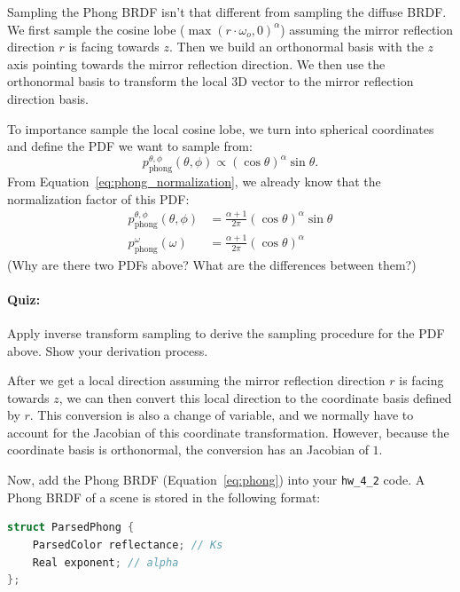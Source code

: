 Sampling the Phong BRDF isn't that different from sampling the diffuse BRDF. We first sample the cosine lobe ($\max\left(r \cdot \omega_o, 0\right)^\alpha$) assuming the mirror reflection direction $r$ is facing towards $z$. Then we build an orthonormal basis with the $z$ axis pointing towards the mirror reflection direction. We then use the orthonormal basis to transform the local 3D vector to the mirror reflection direction basis.

To importance sample the local cosine lobe, we turn into spherical coordinates and define the PDF we want to sample from:
\begin{equation}
p_{\text{phong}}^{\theta, \phi}(\theta, \phi) \propto \left(\cos\theta\right)^{\alpha} \sin\theta.
\end{equation}
From Equation~\eqref{eq:phong_normalization}, we already know that the normalization factor of this PDF:
\begin{equation}
\begin{aligned}
p_{\text{phong}}^{\theta, \phi}(\theta, \phi) &= \frac{\alpha + 1}{2\pi}\left(\cos\theta\right)^{\alpha} \sin\theta \\
p_{\text{phong}}^{\omega}(\omega) &= \frac{\alpha + 1}{2\pi}\left(\cos\theta\right)^{\alpha}
\end{aligned}
\end{equation}
(Why are there two PDFs above? What are the differences between them?)

\paragraph{Quiz:} Apply inverse transform sampling to derive the sampling procedure for the PDF above. Show your derivation process.

After we get a local direction assuming the mirror reflection direction $r$ is facing towards $z$, we can then convert this local direction to the coordinate basis defined by $r$. This conversion is also a change of variable, and we normally have to account for the Jacobian of this coordinate transformation. However, because the coordinate basis is orthonormal, the conversion has an Jacobian of $1$.

Now, add the Phong BRDF (Equation~\eqref{eq:phong}) into your \lstinline{hw_4_2} code. A Phong BRDF of a scene is stored in the following format:
\begin{lstlisting}[language=C++]
struct ParsedPhong {
    ParsedColor reflectance; // Ks
    Real exponent; // alpha
};
\end{lstlisting}

